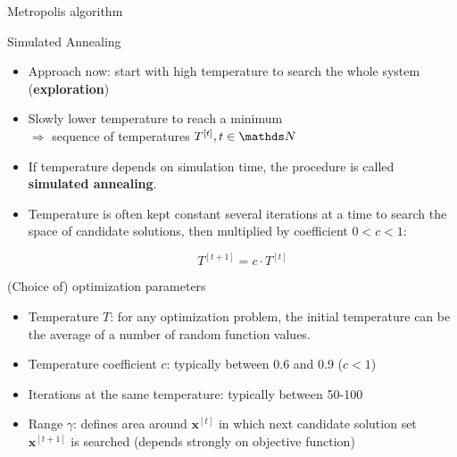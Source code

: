 \documentclass[11pt,compress,t,notes=noshow, xcolor=table]{beamer}
\begin{document}
\begin{vbframe}{Metropolis algorithm}


\end{vbframe}

\begin{vbframe}{Simulated Annealing}
\begin{itemize}
\item Approach now: start with high temperature to search the whole system (\textbf{exploration})
\item Slowly lower temperature to reach a minimum \\
$\Rightarrow$ sequence of temperatures $T^{[t]}, t \in \N$
\item If temperature depends on simulation time, the procedure is called \textbf{simulated annealing}.
\item Temperature is often kept constant several iterations at a time to search the space of candidate solutions, then multiplied by coefficient $0<c<1$:

$$
T^{[t+1]} = c \cdot T^{[t]}
$$
\end{itemize}

\framebreak


\framebreak
(Choice of) optimization parameters \\
\begin{itemize}
\item Temperature $T$: for any optimization problem, the initial temperature can be the average of a number of random function values.
\vspace{0.1cm}
\item Temperature coefficient $c$: typically between 0.6 and 0.9 ($c<1$)
\vspace{0.1cm}
\item Iterations at the same temperature: typically between 50-100
\vspace{0.1cm}
\item Range $\gamma$: defines area around $\bm{x}^{[t]}$ in which next candidate solution set $\bm{x}^{[t+1]}$ is searched (depends strongly on objective function)
\end{itemize}

\end{vbframe}
\end{document}
